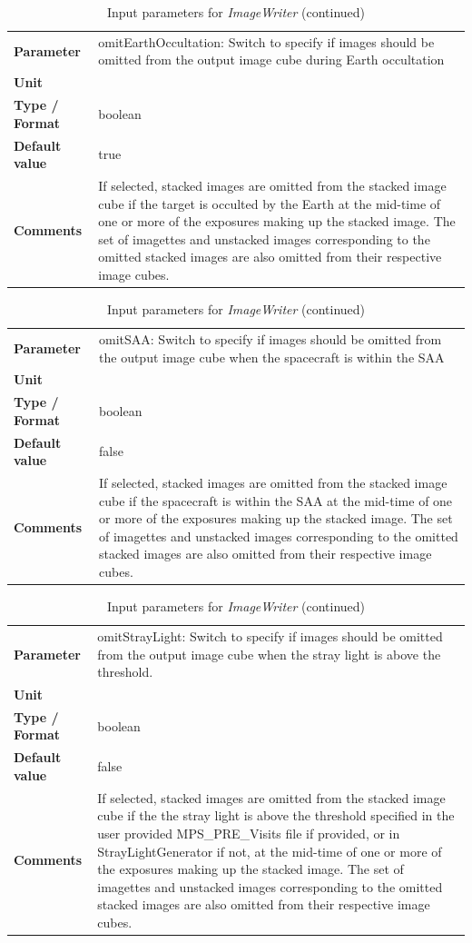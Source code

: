 \documentclass[11pt]{article}      %
\def\HCode#1{}
\def\htmlanchor#1{\HCode{<a id="#1"></a>}}
\begin{document}
\begin{table}[hb]
  \caption{Input parameters for {\it ImageWriter} (continued)}

  \htmlanchor{omitEarthOccultation}
  \begin{tabular}{| l | p{13cm} |}
    \hline 
    {\bf Parameter} & omitEarthOccultation: Switch to specify if images should be omitted from the output image cube during Earth occultation\\
    {\bf Unit} & \\
    {\bf Type / Format} & boolean\\
    {\bf Default value} & true\\
    {\bf Comments} & If selected, stacked images are omitted from the stacked image cube if the target is occulted by the Earth at the mid-time of one or more of the exposures making up the stacked image. The set of imagettes and unstacked images corresponding to the omitted stacked images are also omitted from their respective image cubes.\\
    \hline
  \end{tabular}
  \bigskip

  \htmlanchor{omitSAA}
  \begin{tabular}{| l | p{13cm} |}
    \hline 
    {\bf Parameter} & omitSAA: Switch to specify if images should be omitted from the output image cube when the spacecraft is within the SAA\\
    {\bf Unit} & \\
    {\bf Type / Format} & boolean\\
    {\bf Default value} & false\\
    {\bf Comments} & If selected, stacked images are omitted from the stacked image cube if the spacecraft is within the SAA at the mid-time of one or more of the exposures making up the stacked image. The set of imagettes and unstacked images corresponding to the omitted stacked images are also omitted from their respective image cubes.\\
    \hline
  \end{tabular}
  \bigskip

  \htmlanchor{omitStrayLight}
  \begin{tabular}{| l | p{13cm} |}
    \hline 
    {\bf Parameter} & omitStrayLight: Switch to specify if images should be omitted from the output image cube when the stray light is above the threshold.\\
    {\bf Unit} & \\
    {\bf Type / Format} & boolean\\
    {\bf Default value} & false\\
    {\bf Comments} & If selected, stacked images are omitted from the stacked image cube if the the stray light is above the threshold specified in the user provided MPS\_PRE\_Visits file if provided, or in StrayLightGenerator if not, at the mid-time of one or more of the exposures making up the stacked image. The set of imagettes and unstacked images corresponding to the omitted stacked images are also omitted from their respective image cubes.\\
    \hline
  \end{tabular}
  \bigskip


\end{table}
\end{document}
